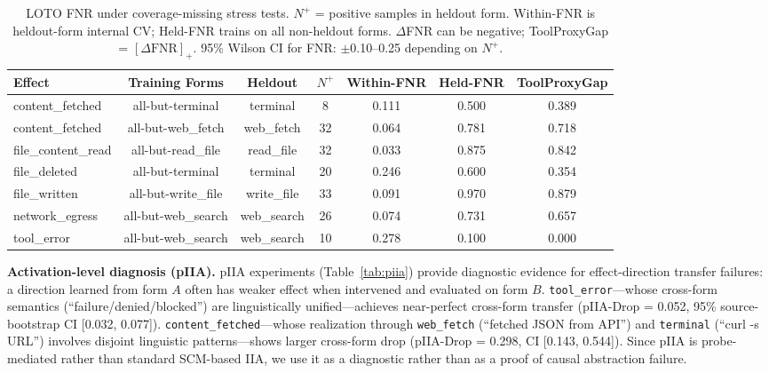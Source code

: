 \documentclass{article}
\begin{document}
\begin{table}[t]
\centering
\caption{LOTO FNR under coverage-missing stress tests. $N^+$ = positive samples in heldout form. Within-FNR is heldout-form internal CV; Held-FNR trains on all non-heldout forms. $\Delta$FNR can be negative; ToolProxyGap = $[\Delta\text{FNR}]_+$. 95\% Wilson CI for FNR: $\pm$0.10--0.25 depending on $N^+$.}
\label{tab:loto}
\begin{tabular}{lcccccc}
\toprule
Effect & Training Forms & Heldout & $N^+$ & Within-FNR & Held-FNR & ToolProxyGap \\
\midrule
content\_fetched & all-but-terminal & terminal & 8 & 0.111 & 0.500 & 0.389 \\
content\_fetched & all-but-web\_fetch & web\_fetch & 32 & 0.064 & 0.781 & 0.718 \\
file\_content\_read & all-but-read\_file & read\_file & 32 & 0.033 & 0.875 & 0.842 \\
file\_deleted & all-but-terminal & terminal & 20 & 0.246 & 0.600 & 0.354 \\
file\_written & all-but-write\_file & write\_file & 33 & 0.091 & 0.970 & 0.879 \\
network\_egress & all-but-web\_search & web\_search & 26 & 0.074 & 0.731 & 0.657 \\
tool\_error & all-but-web\_search & web\_search & 10 & 0.278 & 0.100 & 0.000 \\
\bottomrule
\end{tabular}
\end{table}

\textbf{Activation-level diagnosis (pIIA).} pIIA experiments (Table~\ref{tab:piia}) provide diagnostic evidence for effect-direction transfer failures: a direction learned from form $A$ often has weaker effect when intervened and evaluated on form $B$. \texttt{tool\_error}---whose cross-form semantics (``failure/denied/blocked'') are linguistically unified---achieves near-perfect cross-form transfer (pIIA-Drop = 0.052, 95\% source-bootstrap CI [0.032, 0.077]). \texttt{content\_fetched}---whose realization through \texttt{web\_fetch} (``fetched JSON from API'') and \texttt{terminal} (``curl -s URL'') involves disjoint linguistic patterns---shows larger cross-form drop (pIIA-Drop = 0.298, CI [0.143, 0.544]). Since pIIA is probe-mediated rather than standard SCM-based IIA, we use it as a diagnostic rather than as a proof of causal abstraction failure.
\end{document}
